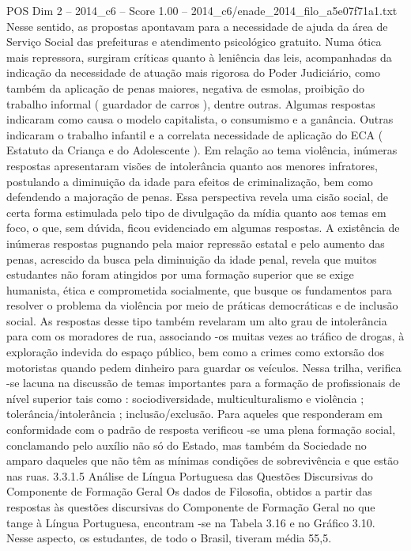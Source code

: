 \begin{textsample}{POS Dim 2 – 2014\_c6 – Score 1.00 – 2014\_c6/enade\_2014\_filo\_a5e07f71a1.txt}
Nesse sentido, as propostas apontavam para a necessidade de ajuda da área de Serviço Social das prefeituras e atendimento psicológico gratuito.
Numa ótica mais repressora, surgiram críticas quanto à leniência das leis, acompanhadas da indicação da necessidade de atuação mais rigorosa do Poder Judiciário, como também da aplicação de penas maiores, negativa de esmolas, proibição do trabalho informal ( guardador de carros ), dentre outras.
Algumas respostas indicaram como causa o modelo capitalista, o consumismo e a ganância.
Outras indicaram o trabalho infantil e a correlata necessidade de aplicação do ECA ( Estatuto da Criança e do Adolescente ).
Em relação ao tema violência, inúmeras respostas apresentaram visões de intolerância quanto aos menores infratores, postulando a diminuição da idade para efeitos de criminalização, bem como defendendo a majoração de penas.
Essa perspectiva revela uma cisão social, de certa forma estimulada pelo tipo de divulgação da mídia quanto aos temas em foco, o que, sem dúvida, ficou evidenciado em algumas respostas.
A existência de inúmeras respostas pugnando pela maior repressão estatal e pelo aumento das penas, acrescido da busca pela diminuição da idade penal, revela que muitos estudantes não foram atingidos por uma formação superior que se exige humanista, ética e comprometida socialmente, que busque os fundamentos para resolver o problema da violência por meio de práticas democráticas e de inclusão social.
As respostas desse tipo também revelaram um alto grau de intolerância para com os moradores de rua, associando -os muitas vezes ao tráfico de drogas, à exploração indevida do espaço público, bem como a crimes como extorsão dos motoristas quando pedem dinheiro para guardar os veículos.
Nessa trilha, verifica -se lacuna na discussão de temas importantes para a formação de profissionais de nível superior tais como : sociodiversidade, multiculturalismo e violência ; tolerância/intolerância ; inclusão/exclusão.
Para aqueles que responderam em conformidade com o padrão de resposta verificou -se uma plena formação social, conclamando pelo auxílio não só do Estado, mas também da Sociedade no amparo daqueles que não têm as mínimas condições de sobrevivência e que estão nas ruas. 3.3.1.5 Análise de Língua Portuguesa das Questões Discursivas do Componente de Formação Geral Os dados de Filosofia, obtidos a partir das respostas às questões discursivas do Componente de Formação Geral no que tange à Língua Portuguesa, encontram -se na Tabela 3.16 e no Gráfico 3.10.
Nesse aspecto, os estudantes, de todo o Brasil, tiveram média 55,5.

\end{textsample}
